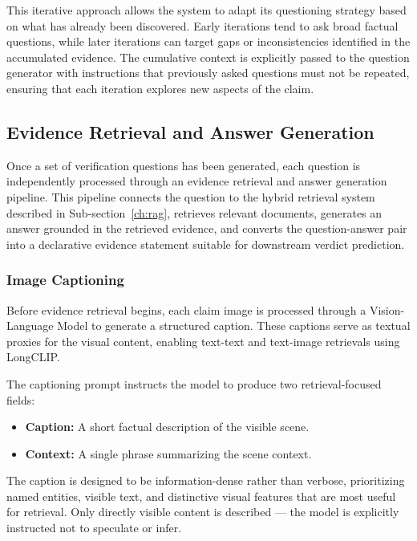This iterative approach allows the system to adapt its questioning strategy based on what has already been discovered. Early iterations tend to ask broad factual questions, while later iterations can target gaps or inconsistencies identified in the accumulated evidence. The cumulative context is explicitly passed to the question generator with instructions that previously asked questions must not be repeated, ensuring that each iteration explores new aspects of the claim.

\subsection{Evidence Retrieval and Answer Generation}

Once a set of verification questions has been generated, each question is independently processed through an evidence retrieval and answer generation pipeline. This pipeline connects the question to the hybrid retrieval system described in Sub-section~\ref{ch:rag}, retrieves relevant documents, generates an answer grounded in the retrieved evidence, and converts the question-answer pair into a declarative evidence statement suitable for downstream verdict prediction.

\subsubsection{Image Captioning}
\label{subsection:caption}
Before evidence retrieval begins, each claim image is processed through a Vision-Language Model to generate a structured caption. These captions serve as textual proxies for the visual content, enabling text-text and text-image retrievals using LongCLIP.

The captioning prompt instructs the model to produce two retrieval-focused fields:

\begin{itemize}
    \item \textbf{Caption:} A short factual description of the visible scene.
    \item \textbf{Context:} A single phrase summarizing the scene context.
\end{itemize}

The caption is designed to be information-dense rather than verbose, prioritizing named entities, visible text, and distinctive visual features that are most useful for retrieval. Only directly visible content is described — the model is explicitly instructed not to speculate or infer.

